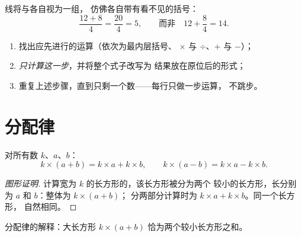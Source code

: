 \begin{remark}[分数线会隐藏括号]
线将与各自视为一组，
仿佛各自带有看不见的括号：
\[
\frac{12 + 8}{4} = \frac{20}{4} = 5,
\qquad\text{而非}\quad 12 + \frac{8}{4} = 14 .
\]
\end{remark}

\begin{method}[安全计算]\label{met:g7:priorities:safe}
\begin{enumerate}
  \item 找出应先进行的运算（依次为最内层括号、
        $\times$ 与 $\div$、$+$ 与 $-$）；
  \item \emph{只计算这一步}，并将整个式子改写为
        结果放在原位后的形式；
  \item 重复上述步骤，直到只剩一个数——每行只做一步运算，
        不跳步。
\end{enumerate}
\end{method}

\section{分配律}

\begin{theorem}[分配律]\label{thm:g7:priorities:distributivity}
对所有数 $k$、$a$、$b$：
\[
k \times (a + b) = k \times a + k \times b,
\qquad
k \times (a - b) = k \times a - k \times b .
\]
\end{theorem}

\begin{proof}[图形证明]
计算宽为 $k$ 的长方形的，该长方形被分为两个
较小的长方形，长分别为 $a$ 和 $b$：整体为 $k \times (a+b)$；
分两部分计算时为 $k \times a + k \times b$。同一个长方形，
自然相同。
\end{proof}

\begin{omfigure}

{\small 分配律的解释：大长方形
$k \times (a + b)$ 恰为两个较小长方形之和。}
\end{omfigure}

